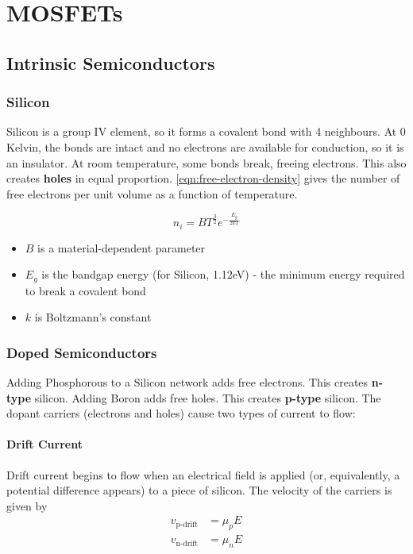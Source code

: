 \documentclass[11pt]{report}
\begin{document}
\setcounter{chapter}{-1}

\chapter{MOSFETs}

\section{Intrinsic Semiconductors}

\subsection*{Silicon}

Silicon is a group IV element, so it forms a covalent bond with 4 neighbours. At 0 Kelvin, the bonds are intact and no electrons are available for conduction, so it is an insulator. At room temperature, some bonds break, freeing electrons. This also creates \textbf{holes} in equal proportion. \autoref{eqn:free-electron-density} gives the number of free electrons per unit volume as a function of temperature.


\begin{equation}
	\label{eqn:free-electron-density}
	n_i = BT^{\frac{3}{2}}e^{-\frac{E_g}{2kT}}
\end{equation}

\begin{itemize}
	\item $B$ is a material-dependent parameter
	\item $E_g$ is the bandgap energy (for Silicon, 1.12eV) - the minimum energy required to break a covalent bond
	\item $k$ is Boltzmann's constant
\end{itemize}

\subsection*{Doped Semiconductors}

Adding Phosphorous to a Silicon network adds free electrons. This creates \textbf{n-type} silicon. Adding Boron adds free holes. This creates \textbf{p-type} silicon. The dopant carriers (electrons and holes) cause two types of current to flow:

\subsubsection*{Drift Current}
Drift current begins to flow when an electrical field is applied (or, equivalently, a potential difference appears) to a piece of silicon. The velocity of the carriers is given by
\begin{align*}
		v_{\text{p-drift}} &= \mu_p E \\
		v_{\text{n-drift}} &= \mu_n E
\end{align*}
\end{document}
